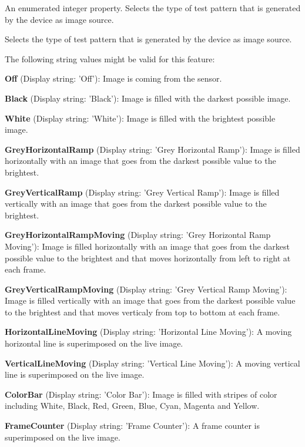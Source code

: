 An enumerated integer property. Selects the type of test pattern that is generated by the device as image source. 

Selects the type of test pattern that is generated by the device as image source.

The following string values might be valid for this feature\+:
\begin{DoxyItemize}
\item {\bfseries Off} (Display string\+: 'Off')\+: Image is coming from the sensor.
\item {\bfseries Black} (Display string\+: 'Black')\+: Image is filled with the darkest possible image.
\item {\bfseries White} (Display string\+: 'White')\+: Image is filled with the brightest possible image.
\item {\bfseries Grey\+Horizontal\+Ramp} (Display string\+: 'Grey Horizontal Ramp')\+: Image is filled horizontally with an image that goes from the darkest possible value to the brightest.
\item {\bfseries Grey\+Vertical\+Ramp} (Display string\+: 'Grey Vertical Ramp')\+: Image is filled vertically with an image that goes from the darkest possible value to the brightest.
\item {\bfseries Grey\+Horizontal\+Ramp\+Moving} (Display string\+: 'Grey Horizontal Ramp Moving')\+: Image is filled horizontally with an image that goes from the darkest possible value to the brightest and that moves horizontally from left to right at each frame.
\item {\bfseries Grey\+Vertical\+Ramp\+Moving} (Display string\+: 'Grey Vertical Ramp Moving')\+: Image is filled vertically with an image that goes from the darkest possible value to the brightest and that moves verticaly from top to bottom at each frame.
\item {\bfseries Horizontal\+Line\+Moving} (Display string\+: 'Horizontal Line Moving')\+: A moving horizontal line is superimposed on the live image.
\item {\bfseries Vertical\+Line\+Moving} (Display string\+: 'Vertical Line Moving')\+: A moving vertical line is superimposed on the live image.
\item {\bfseries Color\+Bar} (Display string\+: 'Color Bar')\+: Image is filled with stripes of color including White, Black, Red, Green, Blue, Cyan, Magenta and Yellow.
\item {\bfseries Frame\+Counter} (Display string\+: 'Frame Counter')\+: A frame counter is superimposed on the live image.
\end{DoxyItemize}

